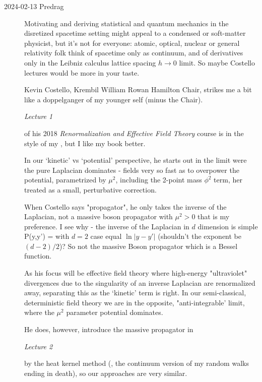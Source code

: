 \begin{description}

\item[2024-02-13 Predrag]
Motivating and deriving statistical and quantum mechanics in the
disretized spacetime setting might appeal to a condensed or soft-matter
physicist, but it's not for everyone: atomic, optical, nuclear or general
relativity folk think of spacetime only as continuum, and of derivatives
only in the Leibniz calculus lattice spacing $h\to0$ limit. So maybe
Costello lectures would be more in your taste.

{Kevin Costello}, Krembil William Rowan Hamilton Chair,
 strikes me a bit like a doppelganger of my
younger self (minus the Chair).

 {\em Lecture 1}

of his 2018
{\em Renormalization and Effective Field Theory} course
is in the style of my , but I like my book better.

In our `kinetic' vs `potential' perspective, he starts out in the limit
were the pure Laplacian dominates  - fields very so fast as to overpower
the potential, parametrized by $\mu^2$, including the 2-point mass
$\phi^2$ term, her treated as a small, perturbative correction.

When Costello says "propagator", he only takes the inverse of the
Laplacian, not a massive boson propagator with $\mu^2>0$ that is my
preference. I see why - the inverse of the Laplacian in $d$ dimension is
simple
\beq
P(y,y') = 
with $d=2$ case equal $\ln|y-y'|$ (shouldn't the exponent be $(d-2)/2$)?
So not the massive Boson propagator which is a Bessel function.

As his focus will be effective field theory where high-energy
"ultraviolet" divergences due to the singularity of an inverse Laplacian
are renormalized away, separating this as the `kinetic' term is right.
In our semi-classical, deterministic field theory we are in the opposite,
"anti-integrable' limit, where the $\mu^2$ parameter potential dominates.

He does, however,  introduce the massive propagator in

  {\em Lecture 2}

by the heat kernel method (\ie, the continuum version of my random
walks ending in death), so our approaches are very similar.


\end{description}

